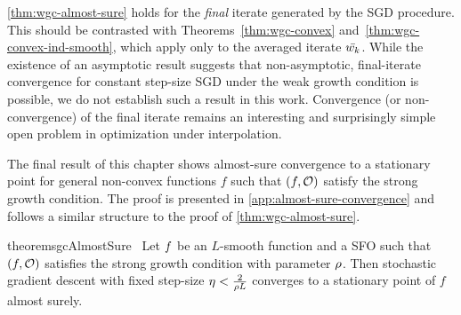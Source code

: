 \autoref{thm:wgc-almost-sure} holds for the \emph{final} iterate generated by the \ac{SGD} procedure.
This should be contrasted with Theorems~\ref{thm:wgc-convex} and~\ref{thm:wgc-convex-ind-smooth}, which apply only to the averaged iterate \( \bar \wk \).
While the existence of an asymptotic result suggests that non-asymptotic, final-iterate convergence for constant step-size \ac{SGD} under the weak growth condition is possible, we do not establish such a result in this work. 
Convergence (or non-convergence) of the final iterate remains an interesting and surprisingly simple open problem in optimization under interpolation.

The final result of this chapter shows almost-sure convergence to a stationary point for general non-convex functions \( f \) such that \( \rbr{f, \oracle{}} \) satisfy the strong growth condition.
The proof is presented in \autoref{app:almost-sure-convergence} and follows a similar structure to the proof of \autoref{thm:wgc-almost-sure}.

\begin{restatable}{theorem}{sgcAlmostSure}~\label{thm:sgc-almost-sure}
    Let \( \f \) be an \( L \)-smooth function and \oracle{} a SFO such that \( \rbr{f, \oracle{}} \) satisfies the strong growth condition with parameter \( \sgc \).
    Then stochastic gradient descent with fixed step-size \(\eta < \frac{2}{\sgc L} \) converges to a stationary point of \( f \) almost surely.
\end{restatable}

\endinput

